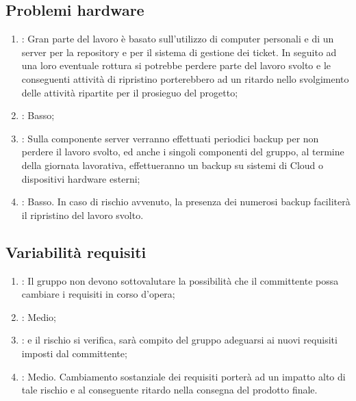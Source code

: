 \subsection{Problemi hardware}
\begin{enumerate}
\item {}: Gran parte del lavoro è basato sull'utilizzo di computer personali e di un server per la repository e per il sistema di gestione dei ticket. In seguito ad una loro eventuale rottura si potrebbe perdere parte del lavoro svolto e le conseguenti attività di ripristino porterebbero ad un  ritardo nello svolgimento delle attività ripartite per il prosieguo del progetto;
\item {}: Basso;
\item {}: Sulla componente server verranno effettuati periodici backup per non perdere il lavoro svolto, ed anche i singoli componenti del gruppo, al termine della giornata lavorativa, effettueranno un backup su sistemi di Cloud o dispositivi hardware esterni;
\item {}: Basso. In caso di rischio avvenuto, la presenza dei numerosi backup faciliterà il ripristino del lavoro svolto.
\end{enumerate}

\subsection{Variabilità requisiti}
\begin{enumerate}
\item {}: Il gruppo non devono sottovalutare la possibilità che il committente possa cambiare i requisiti in corso d'opera;
\item {}: Medio;
\item {}: e il rischio si verifica, sarà compito del gruppo adeguarsi ai nuovi requisiti imposti dal committente;
\item {}: Medio. Cambiamento sostanziale dei requisiti porterà ad un impatto alto di tale rischio e al conseguente ritardo nella consegna del prodotto finale.
\end{enumerate}

